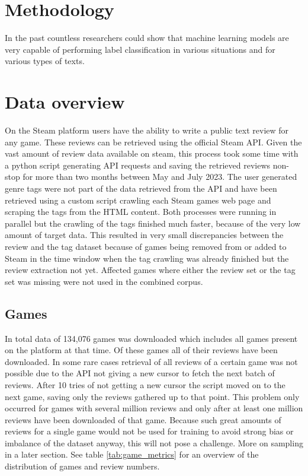 \documentclass[11pt, a4paper]{article}
\begin{document}
\section{Methodology}
In the past countless researchers could show that machine learning models are very capable of performing label classification in various situations and for various types of texts. 


\section{Data overview}
On the Steam platform users have the ability to write a public text review for any game. These reviews can be retrieved using the official Steam API. Given the vast amount of review data available on steam, this process took some time with a python script generating API requests and saving the retrieved reviews non-stop for more than two months between May and July 2023. The user generated genre tags were not part of the data retrieved from the API and have been retrieved using a custom script crawling each Steam games web page and scraping the tags from the HTML content. Both processes were running in parallel but the crawling of the tags finished much faster, because of the very low amount of target data. This resulted in very small discrepancies between the review and the tag dataset because of games being removed from or added to Steam in the time window when the tag crawling was already finished but the review extraction not yet. Affected games where either the review set or the tag set was missing were not used in the combined corpus.

\subsection{Games}
In total data of 134,076 games was downloaded which includes all games present on the platform at that time. Of these games all of their reviews have been downloaded. In some rare cases retrieval of all reviews of a certain game was not possible due to the API not giving a new cursor to fetch the next batch of reviews. After 10 tries of not getting a new cursor the script moved on to the next game, saving only the reviews gathered up to that point. This problem only occurred for games with several million reviews and only after at least one million reviews have been downloaded of that game. Because such great amounts of reviews for a single game would not be used for training to avoid strong bias or imbalance of the dataset anyway, this will not pose a challenge. More on sampling in a later section. See table \ref{tab:game_metrics} for an overview of the distribution of games and review numbers.
\end{document}
